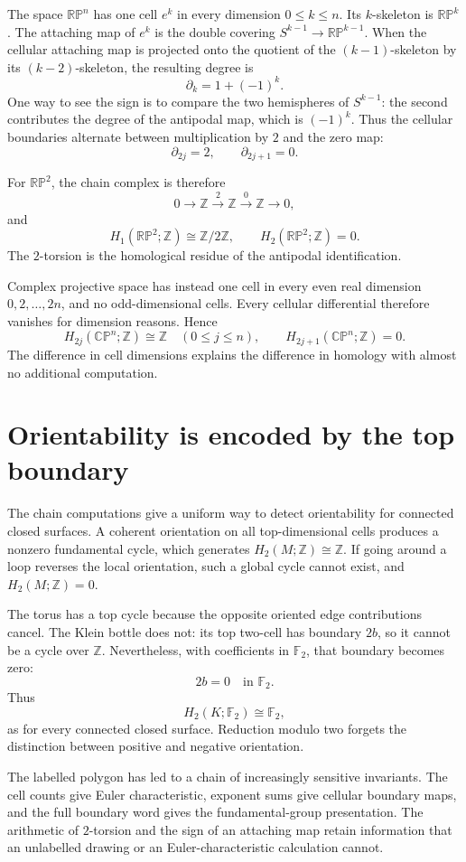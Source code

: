 The space \(\mathbb{RP}^n\) has one cell \(e^k\) in every dimension \(0\le k\le n\). Its \(k\)-skeleton is \(\mathbb{RP}^k\). The attaching map of \(e^k\) is the double covering
\(S^{k-1}\to\mathbb{RP}^{k-1}\). When the cellular attaching map is projected onto the quotient of the \((k-1)\)-skeleton by its \((k-2)\)-skeleton, the resulting degree is
\[
 \boxed{\partial_k=1+(-1)^k.}
\]
One way to see the sign is to compare the two hemispheres of \(S^{k-1}\): the second contributes the degree of the antipodal map, which is \((-1)^k\). Thus the cellular boundaries alternate between multiplication by \(2\) and the zero map:
\[
 \partial_{2j}=2,\qquad \partial_{2j+1}=0.
\]

For \(\mathbb{RP}^2\), the chain complex is therefore
\[
 0\longrightarrow\mathbb Z
 \xrightarrow{\ 2\ }\mathbb Z
 \xrightarrow{\ 0\ }\mathbb Z
 \longrightarrow0,
\]
and
\[
 \boxed{H_1(\mathbb{RP}^2;\mathbb Z)\cong\mathbb Z/2\mathbb Z,
 \qquad H_2(\mathbb{RP}^2;\mathbb Z)=0.}
\]
The \(2\)-torsion is the homological residue of the antipodal identification.

Complex projective space has instead one cell in every even real dimension \(0,2,\ldots,2n\), and no odd-dimensional cells. Every cellular differential therefore vanishes for dimension reasons. Hence
\[
 \boxed{H_{2j}(\mathbb{CP}^n;\mathbb Z)\cong\mathbb Z
 \quad(0\le j\le n),}
 \qquad H_{2j+1}(\mathbb{CP}^n;\mathbb Z)=0.
\]
The difference in cell dimensions explains the difference in homology with almost no additional computation.

\section{Orientability is encoded by the top boundary}

The chain computations give a uniform way to detect orientability for connected closed surfaces. A coherent orientation on all top-dimensional cells produces a nonzero fundamental cycle, which generates \(H_2(M;\mathbb Z)\cong\mathbb Z\). If going around a loop reverses the local orientation, such a global cycle cannot exist, and \(H_2(M;\mathbb Z)=0\).

The torus has a top cycle because the opposite oriented edge contributions cancel. The Klein bottle does not: its top two-cell has boundary \(2b\), so it cannot be a cycle over \(\mathbb Z\). Nevertheless, with coefficients in \(\mathbb F_2\), that boundary becomes zero:
\[
 2b=0\quad\text{in }\mathbb F_2.
\]
Thus
\[
 H_2(K;\mathbb F_2)\cong\mathbb F_2,
\]
as for every connected closed surface. Reduction modulo two forgets the distinction between positive and negative orientation.

The labelled polygon has led to a chain of increasingly sensitive invariants. The cell counts give Euler characteristic, exponent sums give cellular boundary maps, and the full boundary word gives the fundamental-group presentation. The arithmetic of \(2\)-torsion and the sign of an attaching map retain information that an unlabelled drawing or an Euler-characteristic calculation cannot.
